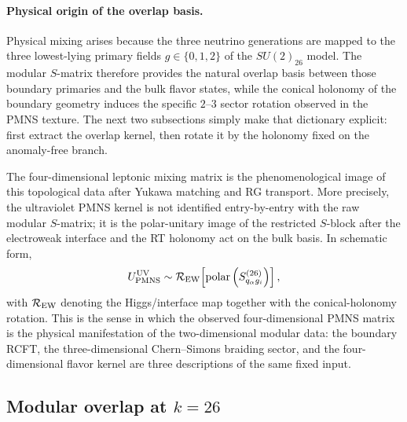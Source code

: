 \documentclass[11pt]{article}
\begin{document}
\paragraph{Physical origin of the overlap basis.}
Physical mixing arises because the three neutrino generations are mapped to the three lowest-lying primary fields $g\in\{0,1,2\}$ of the $SU(2)_{26}$ model. The modular $S$-matrix therefore provides the natural overlap basis between those boundary primaries and the bulk flavor states, while the conical holonomy of the boundary geometry induces the specific $2$--$3$ sector rotation observed in the PMNS texture. The next two subsections simply make that dictionary explicit: first extract the overlap kernel, then rotate it by the holonomy fixed on the anomaly-free branch.

The four-dimensional leptonic mixing matrix is the phenomenological image of this topological data after Yukawa matching and RG transport. More precisely, the ultraviolet PMNS kernel is not identified entry-by-entry with the raw modular $S$-matrix; it is the polar-unitary image of the restricted $S$-block after the electroweak interface and the RT holonomy act on the bulk basis. In schematic form,
\begin{equation}
 U_{\rm PMNS}^{\rm UV}
 \sim
 \mathcal R_{\rm EW}\!\left[\operatorname{polar}\left(S^{(26)}_{q_\alpha g_i}\right)\right],
\end{equation}
with $\mathcal R_{\rm EW}$ denoting the Higgs/interface map together with the conical-holonomy rotation. This is the sense in which the observed four-dimensional PMNS matrix is the physical manifestation of the two-dimensional modular data: the boundary RCFT, the three-dimensional Chern--Simons braiding sector, and the four-dimensional flavor kernel are three descriptions of the same fixed input.

\subsection{Modular overlap at $k=26$}
\end{document}
